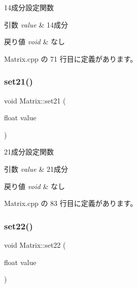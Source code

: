 14成分設定関数 


\begin{DoxyParams}{引数}
{\em value} & 14成分 \\
\hline
\end{DoxyParams}

\begin{DoxyRetVals}{戻り値}
{\em void} & なし \\
\hline
\end{DoxyRetVals}


 Matrix.\+cpp の 71 行目に定義があります。

\mbox{\label{class_matrix_a05f282ddbc60accffe4f1577a93c4d01}} 
\subsubsection{\texorpdfstring{set21()}{set21()}}
{\footnotesize\ttfamily void Matrix\+::set21 (\begin{DoxyParamCaption}\item[{float}]{value }\end{DoxyParamCaption})}



21成分設定関数 


\begin{DoxyParams}{引数}
{\em value} & 21成分 \\
\hline
\end{DoxyParams}

\begin{DoxyRetVals}{戻り値}
{\em void} & なし \\
\hline
\end{DoxyRetVals}


 Matrix.\+cpp の 83 行目に定義があります。

\mbox{\label{class_matrix_a56eee3be58eefa236f75cbf7872e4dbc}} 
\subsubsection{\texorpdfstring{set22()}{set22()}}
{\footnotesize\ttfamily void Matrix\+::set22 (\begin{DoxyParamCaption}\item[{float}]{value }\end{DoxyParamCaption})}



